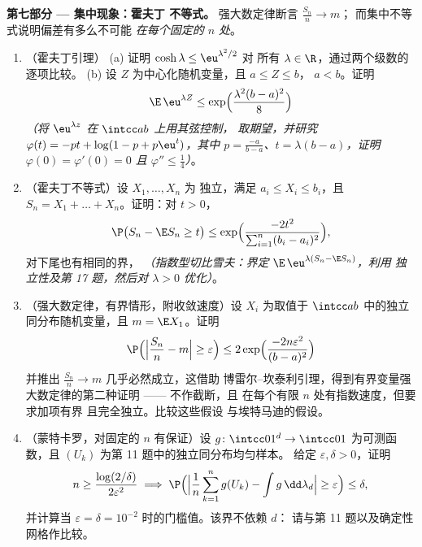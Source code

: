 \begin{problem}
\medskip
\noindent\textbf{第七部分 --- 集中现象：霍夫丁
不等式。} 强大数定律断言 $\frac{S_n}n \to m$；
而集中不等式说明偏差有多么不可能
\emph{在每个固定的 $n$ 处}。
\begin{enumerate}[resume]
  \item（霍夫丁引理）
        (a) 证明 $\cosh\lambda \leq \eu^{\lambda^2/2}$ 对
        所有 $\lambda \in \R$，通过两个级数的
        逐项比较。
        (b) 设 $Z$ 为中心化随机变量，且 $a \leq Z \leq b$，
        $a < b$。证明
        \[
        \E\,\eu^{\lambda Z} \leq
        \exp\Bigl(\frac{\lambda^2(b - a)^2}8\Bigr)
        \]
        \emph{（将 $\eu^{\lambda z}$ 在 $\intcc ab$ 上用其弦控制，
        取期望，并研究 $\varphi(t)
        = -pt + \log(1 - p + p\eu^t)$，其中 $p =
        \frac{-a}{b-a}$、$t = \lambda(b - a)$，证明
        $\varphi(0) = \varphi'(0) = 0$ 且 $\varphi''
        \leq \frac14$）}。
  \item（霍夫丁不等式）设 $X_1, \dots, X_n$ 为
        独立，满足 $a_i \leq X_i \leq b_i$，且 $S_n =
        X_1 + \dots + X_n$。证明：对 $t > 0$，
        \[
        \P\bigl(S_n - \E S_n \geq t\bigr) \leq
        \exp\Bigl(\frac{-2t^2}{\sum_{i=1}^n(b_i -
        a_i)^2}\Bigr),
        \]
        对下尾也有相同的界，
        \emph{（指数型切比雪夫：界定
        $\E\,\eu^{\lambda(S_n - \E S_n)}$，利用
        独立性及第 17 题，然后对
        $\lambda > 0$ 优化）}。
  \item（强大数定律，有界情形，附收敛速度）设
        $X_i$ 为取值于 $\intcc ab$ 中的独立同分布随机变量，且 $m
        = \E X_1$。证明
        \[
        \P\Bigl(\Bigl|\frac{S_n}n - m\Bigr| \geq
        \varepsilon\Bigr) \leq
        2\exp\Bigl(\frac{-2n\varepsilon^2}{(b - a)^2}\Bigr)
        \]
        并推出 $\frac{S_n}n \to m$ 几乎必然成立，这借助
        博雷尔–坎泰利引理，得到有界变量强大数定律的第二种证明 ——
        不作截断，且
        在每个有限 $n$ 处有指数速度，但要求加项有界
        且完全独立。比较这些假设
        与埃特马迪的假设。
  \item（蒙特卡罗，对固定的 $n$ 有保证）设 $g
        \colon \intcc01^d \to \intcc01$ 为可测函数，且
        $(U_k)$ 为第 11 题中的独立同分布均匀样本。
        给定 $\varepsilon, \delta > 0$，证明
        \[
        n \geq \frac{\log(2/\delta)}{2\varepsilon^2}
        \implies
        \P\Bigl(\Bigl|\frac1n\sum_{k=1}^ng(U_k) -
        \int g\,\dd\lambda_d\Bigr| \geq \varepsilon\Bigr)
        \leq \delta,
        \]
        并计算当 $\varepsilon =
        \delta = 10^{-2}$ 时的门槛值。该界不依赖 $d$：
        请与第 11 题以及确定性
        网格作比较。
\end{enumerate}


\end{problem}
